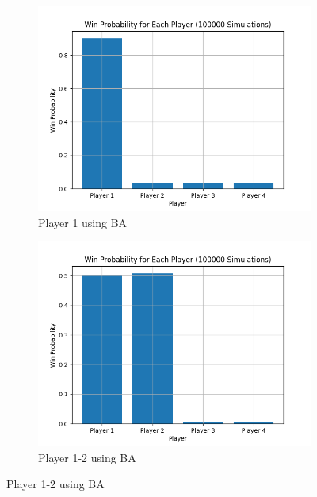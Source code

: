 \documentclass{article}
\begin{document}
\begin{figure}[H]
    \centering
    \begin{subfigure}{0.45\textwidth}
        \centering
        \includegraphics[width=\linewidth]{winning_probabilities_per_mode_1.png}
        \caption{Player 1 using BA}
    \end{subfigure}
    \hfill
    \begin{subfigure}{0.45\textwidth}
        \centering
        \includegraphics[width=\linewidth]{winning_probabilities_per_mode_2.png}
        \caption{Player 1-2 using BA}
    \end{subfigure}
    

\end{figure}
\end{document}
